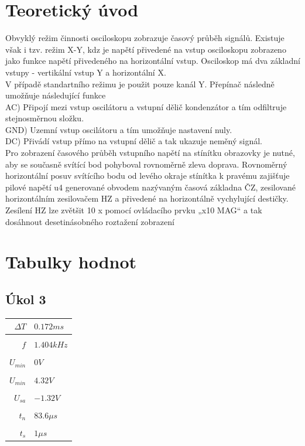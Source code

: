 \documentclass[5pt]{article}
\begin{document}
\section{Teoretický úvod}
Obvyklý režim činnosti osciloskopu zobrazuje časový průběh signálů. Existuje však i tzv. režim X-Y, kdz je napětí přivedené na vstup osciloskopu zobrazeno jako funkce napětí přivedeného na horizontální vstup.
Osciloskop má dva základní vstupy - vertikální vstup Y a horizontální X.\\
V případě standartního režimu je použit pouze kanál Y. Přepínač následně umožňuje následující funkce\\
AC) Připojí mezi vstup oscilátoru a vstupní dělič kondenzátor a tím odfiltruje stejnosměrnou složku.\\
GND) Uzemní vstup oscilátoru a tím umožňuje nastavení nuly.\\
DC) Přivádí vstup přímo na vstupní dělič a tak ukazuje neměný signál.\\
Pro zobrazení časového průběh vstupního napětí na stínítku obrazovky je nutné, aby se současně svítící bod pohyboval rovnoměrně zleva doprava. Rovnoměrný horizontální posuv svítícího bodu od levého okraje stínítka k pravému zajišťuje pilové napětí u4 generované obvodem nazývaným časová základna ČZ, zesilované horizontálním zesilovačem HZ a přivedené na horizontálně vychylující destičky. Zesílení HZ lze zvětšit 10 x pomocí ovládacího prvku „x10 MAG“ a tak dosáhnout desetinásobného
roztažení zobrazení

\section{Tabulky hodnot}
\subsection{Úkol 3}
\begin{tabular}{r|l}
	$ \Delta T $ & $ 0.172 ms $\\ \hline \\
	$ f $ & $ 1.404 kHz $\\ \hline \\
	$ U_{min} $ & $ 0 V $\\ \hline \\
	$ U_{min} $ & $ 4.32 V $\\ \hline \\
	$ U_{sa} $ & $ -1.32 V $\\ \hline \\
	$ t_n $ & $ 83.6 \mu s $ \\ \hline \\
	$ t_s $ & $ 1 \mu s $ \\
\end{tabular}
\end{document}
